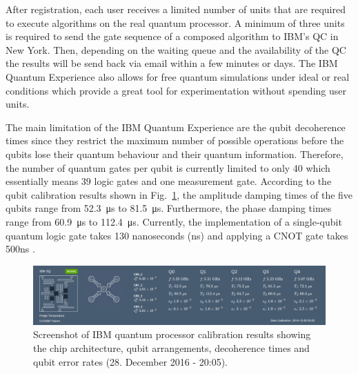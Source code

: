 After registration, each user receives a limited number of units that are required to execute algorithms on the real quantum processor. A minimum of three units is required to send the gate sequence of a composed algorithm to IBM's QC in New York. Then, depending on the waiting queue and the availability of the QC the results will be send back via email within a few minutes or days. The IBM Quantum Experience also allows for free quantum simulations under ideal or real conditions which provide a great tool for experimentation without spending user units.

The main limitation of the IBM Quantum Experience are the qubit decoherence times since they restrict the maximum number of possible operations before the qubits lose their quantum behaviour and their quantum information. Therefore, the number of quantum gates per qubit is currently limited to only 40 which essentially means 39 logic gates and one measurement gate. According to the qubit calibration results shown in Fig.~\ref{fig:calibration}, the amplitude damping times of the five qubits range from \SI{52.3}{\micro\second} to \SI{81.5}{\micro\second}. Furthermore, the phase damping times range from \SI{60.9}{\micro\second} to \SI{112.4}{\micro\second}. Currently, the implementation of a single-qubit quantum logic gate takes 130 nanoseconds (ns) and applying a CNOT gate takes 500ns \cite{ibmgatetimes}.

\begin{figure}[H]
      \centering
       \includegraphics[scale=0.33]{img/ibmcalibration.png}
       \caption[]{\label{fig:calibration} Screenshot of IBM quantum processor calibration results showing the chip architecture, qubit arrangements, decoherence times and qubit error rates (28. December 2016 - 20:05).\footnotemark[12]}
\end{figure}
